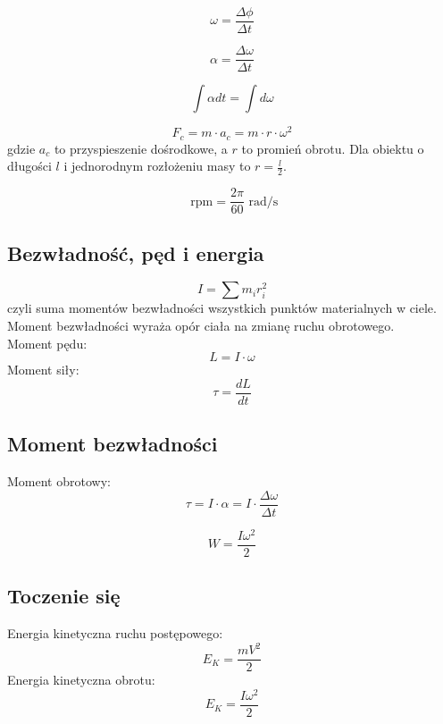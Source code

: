 \documentclass{../notatki}
\begin{document}
\begin{figure*}[h]
  \centering
\end{figure*}

$$
\omega = \frac{\Delta \phi}{\Delta t}
$$

$$
\alpha = \frac{\Delta \omega}{\Delta t}
$$

$$
\int \alpha dt = \int d\omega
$$

$$
F_c = m \cdot a_c = m \cdot r \cdot \omega^2
$$
gdzie $a_c$ to przyspieszenie dośrodkowe, a $r$ to promień obrotu. Dla obiektu
o długości $l$ i jednorodnym rozłożeniu masy to $r = \frac{l}{2}$.

$$
\text{ rpm} = \frac{2\pi}{60} \text{ rad/s}
$$

\subsection{Bezwładność, pęd i energia}

$$
I = \sum m_i r_i^2
$$
czyli suma momentów bezwładności wszystkich punktów materialnych w ciele.
Moment bezwładności wyraża opór ciała na zmianę ruchu obrotowego.\\
Moment pędu:
$$
L = I \cdot \omega
$$
Moment siły:
$$
\tau = \frac{dL}{dt}
$$

\subsection{Moment bezwładności}

Moment obrotowy:
$$
\tau = I \cdot \alpha = I \cdot \frac{\Delta \omega}{\Delta t}
$$

$$
W = \frac{I\omega^2}{2}
$$

\subsection{Toczenie się}

Energia kinetyczna ruchu postępowego:
$$
E_K = \frac{mV^2}{2}
$$
Energia kinetyczna obrotu:
$$
E_K = \frac{I\omega^2}{2}
$$
\end{document}
